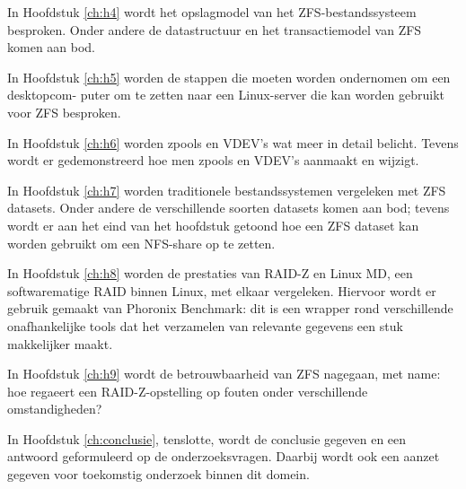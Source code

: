 In Hoofdstuk \ref{ch:h4} wordt het opslagmodel van het ZFS-bestandssysteem besproken. Onder
andere de datastructuur en het transactiemodel van ZFS komen aan bod.

In Hoofdstuk \ref{ch:h5} worden de stappen die moeten worden ondernomen om een desktopcom-
puter om te zetten naar een Linux-server die kan worden gebruikt voor ZFS besproken.

In Hoofdstuk \ref{ch:h6} worden zpools en VDEV’s wat meer in detail belicht. Tevens wordt er
gedemonstreerd hoe men zpools en VDEV’s aanmaakt en wijzigt.

In Hoofdstuk \ref{ch:h7} worden traditionele bestandssystemen vergeleken met ZFS datasets. Onder andere de verschillende soorten datasets komen aan bod; tevens wordt er aan het eind van het hoofdstuk getoond hoe een ZFS dataset kan worden gebruikt om een NFS-share op te zetten.

In Hoofdstuk \ref{ch:h8} worden de prestaties van RAID-Z en Linux MD, een softwarematige RAID binnen Linux, met elkaar vergeleken. Hiervoor wordt er gebruik gemaakt van Phoronix Benchmark: dit is een wrapper rond verschillende onafhankelijke tools dat het verzamelen van relevante gegevens een stuk makkelijker maakt.

In Hoofdstuk \ref{ch:h9} wordt de betrouwbaarheid van ZFS nagegaan, met name: hoe regaeert een RAID-Z-opstelling op fouten onder verschillende omstandigheden?

In Hoofdstuk \ref{ch:conclusie}, tenslotte, wordt de conclusie gegeven en een antwoord geformuleerd op
de onderzoeksvragen. Daarbij wordt ook een aanzet gegeven voor toekomstig onderzoek
binnen dit domein.
